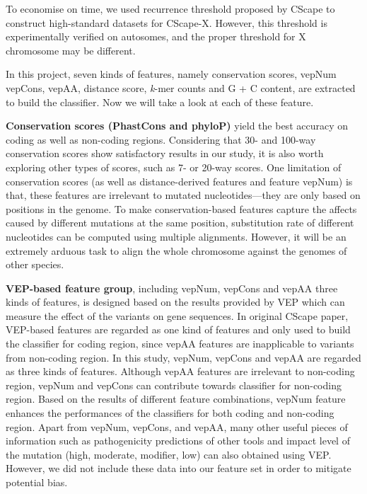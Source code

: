 \documentclass[a4paper,nohyper,nobib,openany,justified]{tufte-book}
\begin{document}
\begin{fullwidth}
To economise on time, we used recurrence threshold proposed by CScape to construct high-standard datasets for CScape-X. However, this threshold is experimentally verified on autosomes, and the proper threshold for X chromosome may be different.

In this project, seven kinds of features, namely conservation scores, vepNum vepCons, vepAA, distance score, \emph{k}-mer counts and G + C content, are extracted to build the classifier. Now we will take a look at each of these feature.

\textbf{Conservation scores (PhastCons and phyloP)} yield the best accuracy on coding as well as non-coding regions. Considering that 30- and 100-way conservation scores show satisfactory results in our study, it is also worth exploring other types of scores, such as 7- or 20-way scores. One limitation of conservation scores (as well as distance-derived features and feature vepNum) is that, these features are irrelevant to mutated nucleotides---they are only based on positions in the genome. To make conservation-based features capture the affects caused by different mutations at the same position, substitution rate of different nucleotides can be computed using multiple alignments. However, it will be an extremely arduous task to align the whole chromosome against the genomes of other species.

\textbf{VEP-based feature group}, including vepNum, vepCons and vepAA three kinds of features, is designed based on the results provided by VEP which can measure the effect of the variants on gene sequences. In original CScape paper, VEP-based features are regarded as one kind of features and only used to build the classifier for coding region, since vepAA features are inapplicable to variants from non-coding region. In this study, vepNum, vepCons and vepAA are regarded as three kinds of features. Although vepAA features are irrelevant to non-coding region, vepNum and vepCons can contribute towards classifier for non-coding region. Based on the results of different feature combinations, vepNum feature enhances the performances of the classifiers for both coding and non-coding region. Apart from vepNum, vepCons, and vepAA, many other useful pieces of information such as pathogenicity predictions of other tools and impact level of the mutation (high, moderate, modifier, low) can also obtained using VEP. However, we did not include these data into our feature set in order to mitigate potential bias.


\end{fullwidth}
\end{document}
